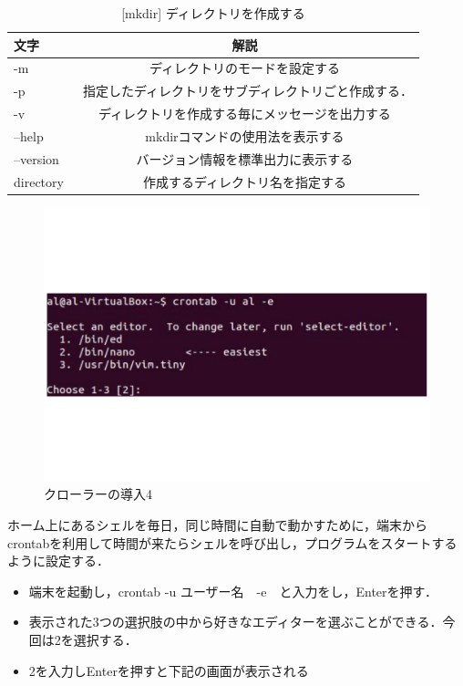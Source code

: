 \begin{table}[H]
  \begin{center}
    \caption{[mkdir] ディレクトリを作成する}
    \begin{tabular}{|l|c|} \hline
      文字 & 解説  \\ \hline
   -m & ディレクトリのモードを設定する　\\
    -p & 指定したディレクトリをサブディレクトリごと作成する．　\\
   -v & ディレクトリを作成する毎にメッセージを出力する　\\
   --help & mkdirコマンドの使用法を表示する \\
--version	& バージョン情報を標準出力に表示する \\
directory & 作成するディレクトリ名を指定する \\ \hline
    \end{tabular}
  \end{center}
\end{table}

\begin{figure}[H]
\centering
\includegraphics[width=13cm]{figure6.pdf}
\caption{クローラーの導入4}\label{sannp}
\end{figure}

ホーム上にあるシェルを毎日，同じ時間に自動で動かすために，端末からcrontabを利用して時間が来たらシェルを呼び出し，プログラムをスタートするように設定する．

\begin{itemize}
 \item 端末を起動し，crontab -u ユーザー名　-e　と入力をし，Enterを押す．
 \item 表示された3つの選択肢の中から好きなエディターを選ぶことができる．今回は2を選択する．
 \item 2を入力しEnterを押すと下記の画面が表示される
\end{itemize}

